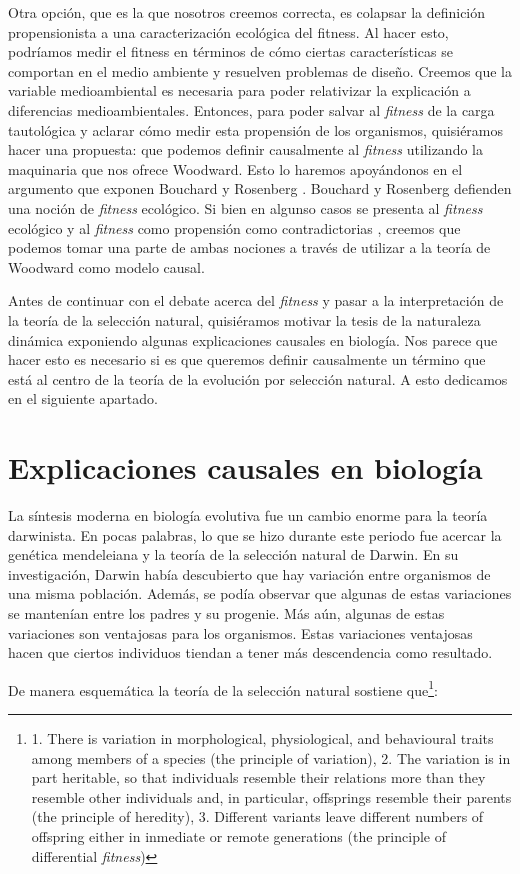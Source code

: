 Otra opción, que es la que nosotros creemos correcta, es colapsar la definición propensionista a una caracterización ecológica del fitness. Al hacer esto, podríamos medir el fitness en términos de cómo ciertas características se comportan en el medio ambiente y resuelven problemas de diseño. Creemos que la variable medioambiental es necesaria para poder relativizar la explicación a diferencias medioambientales. Entonces, para poder salvar al \emph{fitness} de la carga tautológica y aclarar cómo medir esta propensión de los organismos, quisiéramos hacer una propuesta: que podemos definir causalmente al \emph{fitness} utilizando la maquinaria que nos ofrece Woodward. Esto lo haremos apoyándonos en el argumento que exponen Bouchard y Rosenberg \cite{Bouchard2004}. Bouchard y Rosenberg defienden una noción de \emph{fitness} ecológico. Si bien en algunso casos se presenta al \emph{fitness} ecológico y al \emph{fitness} como propensión como contradictorias \cite{sep-fitness}, creemos que podemos tomar una parte de ambas nociones a través de utilizar a la teoría de Woodward como modelo causal.

Antes de continuar con el debate acerca del \emph{fitness} y pasar a la interpretación de la teoría de la selección natural, quisiéramos motivar la tesis de la naturaleza dinámica exponiendo algunas explicaciones causales en biología. Nos parece que hacer esto es necesario si es que queremos definir causalmente un término que está al centro de la teoría de la evolución por selección natural. A esto dedicamos en el siguiente apartado.

\section{Explicaciones causales en biología}

\noindent La síntesis moderna en biología evolutiva fue un cambio enorme para la teoría darwinista. En pocas palabras, lo que se hizo durante este periodo fue acercar la genética mendeleiana y la teoría de la selección natural de Darwin. En su investigación, Darwin había descubierto que hay variación entre organismos de una misma población. Además, se podía observar que algunas de estas variaciones se mantenían entre los padres y su progenie. Más aún, algunas de estas variaciones son ventajosas para los organismos. Estas variaciones ventajosas hacen que ciertos individuos tiendan a tener más descendencia como resultado.

De manera esquemática la teoría de la selección natural sostiene que\footnote{1. There is variation in morphological, physiological, and behavioural traits among members of a species (the principle of variation), 2. The variation is in part heritable, so that individuals resemble their relations more than they resemble other individuals and, in particular, offsprings resemble their parents (the principle of heredity), 3. Different variants leave different numbers of offspring either in inmediate or remote generations (the principle of differential \emph{fitness})}:

